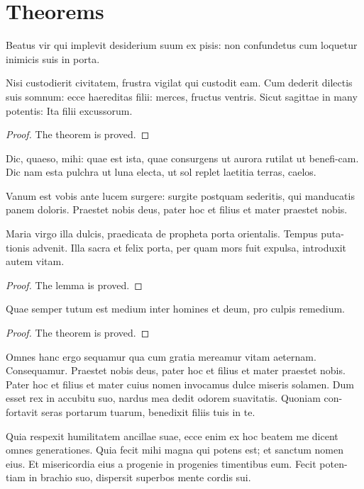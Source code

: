 \documentclass{arkiv}
\begin{document}
\section{Theorems}

Beatus vir qui implevit desiderium
suum ex pisis: non confundetus cum loquetur inimicis suis in porta.

\begin{theorem}
Nisi custodierit civitatem,
frustra vigilat qui custodit eam. Cum dederit dilectis suis somnum:
ecce haereditas filii: merces, fructus ventris. Sicut sagittae in
many potentis: Ita filii excussorum.
\end{theorem}


\begin{proof}
The theorem is proved.
\end{proof}

Dic, quaeso, mihi: quae est ista, quae consurgens ut aurora rutilat
ut benefi-cam.  Dic nam esta pulchra ut luna electa, ut sol replet
laetitia terras, caelos.


\begin{definition}[\cite{SM}]\label{clas}
Vanum est vobis ante lucem surgere: surgite postquam
sederitis, qui manducatis panem doloris. Praestet nobis deus, pater
hoc et filius et mater praestet nobis.
\end{definition}

\begin{lemma}
Maria virgo illa dulcis, praedicata de
propheta porta orientalis. Tempus puta-tionis advenit. Illa sacra et
felix porta, per quam mors fuit expulsa, introduxit autem vitam.
\end{lemma}

\begin{proof}
The lemma is proved.
\end{proof}

\begin{theorem}
Quae
semper tutum est medium inter homines et deum, pro culpis remedium.
\end{theorem}

\begin{proof}
The theorem is proved.
\end{proof}



\begin{acknowledgement}
Omnes hanc ergo sequamur qua cum gratia mereamur vitam aeternam.
Consequamur. Praestet nobis deus, pater hoc et filius et mater
praestet nobis.  Pater hoc et filius et mater cuius nomen invocamus
dulce miseris solamen. Dum esset rex in accubitu suo, nardus mea
dedit odorem suavitatis. Quoniam con-fortavit seras portarum tuarum,
benedixit filiis tuis in te.

Quia respexit humilitatem ancillae suae, ecce enim ex
hoc beatem me dicent omnes generationes. Quia fecit mihi magna qui potens
est; et sanctum nomen eius. Et misericordia eius a progenie in progenies
timentibus eum. Fecit poten-tiam in brachio suo, dispersit superbos mente
cordis sui.
\end{acknowledgement}
\end{document}
